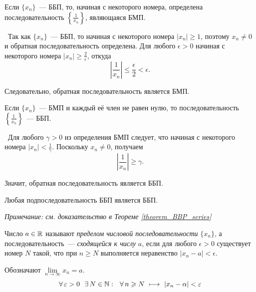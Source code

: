 \begin{theorem}
Если \(\{x_{n}\}\)~--- ББП, то, начиная с некоторого номера, определена
последовательность \(\left\{\frac{1}{x_{n}}\right\}\), являющаяся БМП.

\vspace{2mm}

\proofname~Так как \(\{x_{n}\}\)~--- ББП, то начиная с некоторого
номера \(|x_{n}| \geq 1\), поэтому \(x_{n} \neq 0\) и обратная
последовательность определена. Для любого \(\epsilon > 0\) начиная
с некоторого номера \(|x_{n}| \geq \frac{2}{\epsilon}\), откуда
\[
\left|\frac{1}{x_{n}}\right| \leq \frac{\epsilon}{2}<\epsilon.
\]

Следовательно, обратная последовательность является БМП.~\qedsymbol
\end{theorem}

\begin{theorem}
Если \(\{x_{n}\}\)~--- БМП и каждый её член не равен нулю, то
последовательность \(\left\{\frac{1}{x_{n}}\right\}\)~--- ББП.

\vspace{2mm}

\proofname~Для любого \(\gamma > 0\) из определения БМП следует, что начиная
с некоторого номера \(|x_{n}|<\frac{1}{\gamma}\). Поскольку \(x_{n}\neq 0\), получаем
\[
\left|\frac{1}{x_{n}}\right| \geq \gamma.
\]

Значит, обратная последовательность является ББП.~\qedsymbol
\end{theorem}

\begin{theorem}
Любая подпоследовательность ББП является ББП.

\vspace{2mm}

\textit{Примечание: см. доказательство в Теореме \ref{theorem_BBP_series}}
\end{theorem}


\begin{definition}
Число \(a \in \mathbb{R}\) называют \textit{пределом числовой последовательности}
\(\{x_{n}\}\), а последовательность~--- \textit{сходящейся к числу}
\(a\), если для любого \(\epsilon > 0\) существует номер \(N\) такой,
что при \(n \geq N\) выполняется неравенство \(|x_{n} - a| < \epsilon\).

Обозначают \({\lim\limits_{n\to\infty}x_{n}=a}\).
\[
\forall \, \varepsilon > 0 ~~ \exists \, N \in \mathbb{N}:
~~ \forall \, n \geqslant N ~ \longmapsto ~ |x_{n} - \alpha| < \varepsilon
\]
\end{definition}


